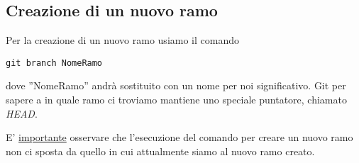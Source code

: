 \subsection{Creazione di un nuovo ramo}
Per la creazione di un nuovo ramo usiamo il comando

\begin{center}
\texttt{git branch NomeRamo}
\end{center}

dove ''NomeRamo'' andrà sostituito con un nome per noi significativo. Git per sapere a in quale ramo ci troviamo mantiene uno speciale puntatore, chiamato \textit{HEAD}.

E' \underline{importante} osservare che l'esecuzione del comando per creare un nuovo ramo non ci sposta da quello in cui attualmente siamo al nuovo ramo creato.
